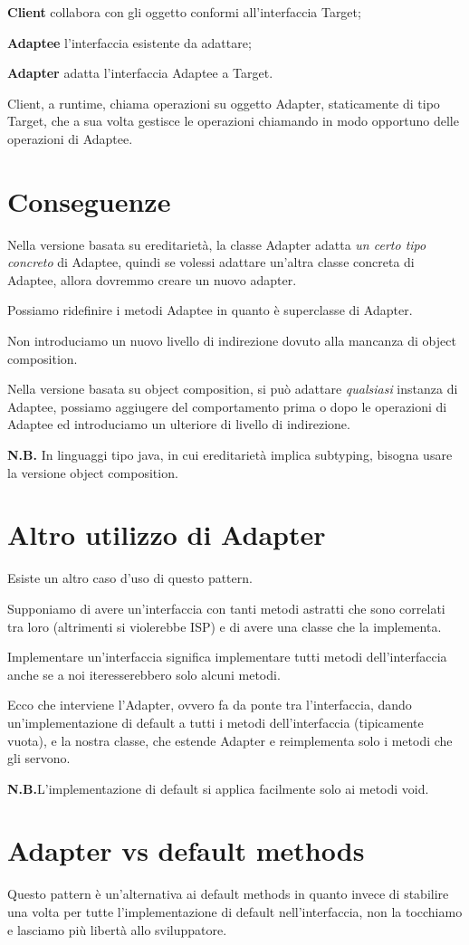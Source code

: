 \textbf{Client} collabora con gli oggetto conformi all'interfaccia Target;

\textbf{Adaptee} l'interfaccia esistente da adattare;

\textbf{Adapter} adatta l'interfaccia Adaptee a Target.

Client, a runtime, chiama operazioni su oggetto Adapter, staticamente di tipo Target, che a sua volta gestisce le operazioni chiamando in modo opportuno delle operazioni 
di Adaptee.

\section{Conseguenze}

Nella versione basata su ereditarietà, la classe Adapter adatta \textit{un certo tipo concreto} di Adaptee, quindi se volessi adattare un'altra classe concreta di 
Adaptee, allora dovremmo creare un nuovo adapter.

Possiamo ridefinire i metodi Adaptee in quanto è superclasse di Adapter.

Non introduciamo un nuovo livello di indirezione dovuto alla mancanza di object composition.

Nella versione basata su object composition, si può adattare \textit{qualsiasi} instanza di Adaptee, possiamo aggiugere del comportamento prima o dopo le operazioni di 
Adaptee ed introduciamo un ulteriore di livello di indirezione.

\medskip
\textbf{N.B.} In linguaggi tipo java, in cui ereditarietà implica subtyping, bisogna usare la versione object composition.

\section{Altro utilizzo di Adapter}

Esiste un altro caso d'uso di questo pattern.

Supponiamo di avere un'interfaccia con tanti metodi astratti che sono correlati tra loro (altrimenti si violerebbe ISP) e di avere una classe che la implementa.

Implementare un'interfaccia significa implementare tutti metodi dell'interfaccia anche se a noi iteresserebbero solo alcuni metodi.

Ecco che interviene l'Adapter, ovvero fa da ponte tra l'interfaccia, dando un'implementazione di default a tutti i metodi dell'interfaccia (tipicamente vuota), e la 
nostra classe, che estende Adapter e reimplementa solo i metodi che gli servono.

\medskip
\textbf{N.B.}L'implementazione di default si applica facilmente solo ai metodi void.

\section{Adapter vs default methods}

Questo pattern è un'alternativa ai default methods in quanto invece di stabilire una volta per tutte l'implementazione di default nell'interfaccia, non la tocchiamo e 
lasciamo più libertà allo sviluppatore.
